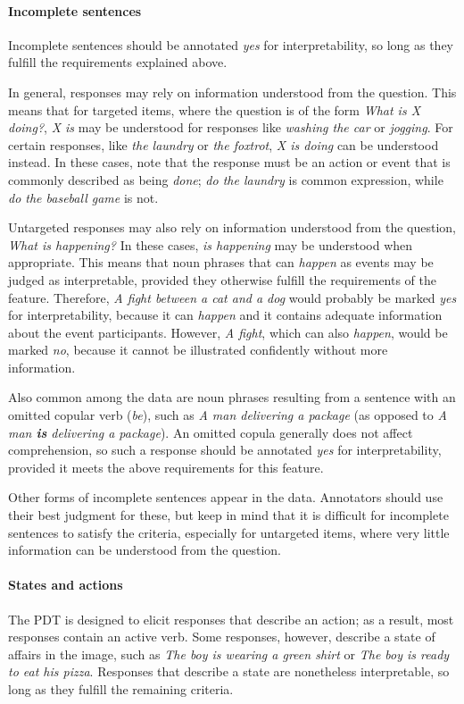 \documentclass[12pt,notitlepage]{article}
\begin{document}
\paragraph{Incomplete sentences} \label{para:interp-incomplete} Incomplete sentences should be annotated \textit{yes} for interpretability, so long as they fulfill the requirements explained above.

In general, responses may rely on information understood from the question. This means that for targeted items, where the question is of the form \textit{What is X doing?}, \textit{X is} may be understood for responses like \textit{washing the car} or \textit{jogging}. For certain responses, like \textit{the laundry} or \textit{the foxtrot}, \textit{X is doing} can be understood instead. In these cases, note that the response must be an action or event that is commonly described as being \textit{done}; \textit{do the laundry} is common expression, while \textit{do the baseball game} is not. 

Untargeted responses may also rely on information understood from the question, \textit{What is happening?} In these cases, \textit{is happening} may be understood when appropriate. This means that noun phrases that can \textit{happen} as events may be judged as interpretable, provided they otherwise fulfill the requirements of the feature. Therefore, \textit{A fight between a cat and a dog} would probably be marked \textit{yes} for interpretability, because it can \textit{happen} and it contains adequate information about the event participants. However, \textit{A fight}, which can also \textit{happen}, would be marked \textit{no}, because it cannot be illustrated confidently without more information.

Also common among the data are noun phrases resulting from a sentence with an omitted copular verb (\textit{be}), such as \textit{A man delivering a package} (as opposed to \textit{A man \textbf{is} delivering a package}). An omitted copula generally does not affect comprehension, so such a response should be annotated \textit{yes} for interpretability, provided it meets the above requirements for this feature.

Other forms of incomplete sentences appear in the data. Annotators should use their best judgment for these, but keep in mind that it is difficult for incomplete sentences to satisfy the criteria, especially for untargeted items, where very little information can be understood from the question.

\paragraph{States and actions} \label{para:interp-question} The PDT is designed to elicit responses that describe an action; as a result, most responses contain an active verb. Some responses, however, describe a state of affairs in the image, such as \textit{The boy is wearing a green shirt} or \textit{The boy is ready to eat his pizza}. Responses that describe a state are nonetheless interpretable, so long as they fulfill the remaining criteria.
\end{document}
